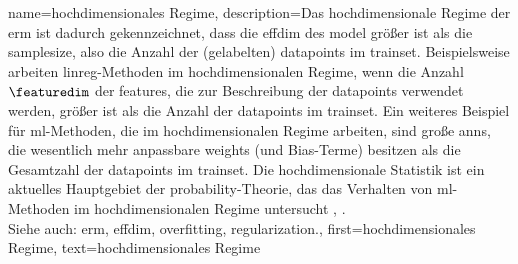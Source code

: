 {{{{
{
    name={hochdimensionales Regime}, 
    description={Das 
        hochdimensionale Regime der \gls{erm} ist dadurch gekennzeichnet, 
        dass die \gls{effdim} des \gls{model} größer ist als die \gls{samplesize}, 
        also die Anzahl der (gelabelten) \glspl{datapoint} im \gls{trainset}. 
        Beispielsweise arbeiten \gls{linreg}-Methoden im hochdimensionalen Regime, 
        wenn die Anzahl $\featuredim$ der \glspl{feature}, die zur Beschreibung der 
        \glspl{datapoint} verwendet werden, größer ist als die Anzahl der \glspl{datapoint} 
        im \gls{trainset}. 
        Ein weiteres Beispiel für \gls{ml}-Methoden, die im hochdimensionalen Regime arbeiten, 
        sind große \glspl{ann}, die wesentlich mehr anpassbare \gls{weights} (und Bias-Terme) 
        besitzen als die Gesamtzahl der \glspl{datapoint} im \gls{trainset}. 
        Die hochdimensionale Statistik ist ein aktuelles Hauptgebiet der 
        \gls{probability}-Theorie, das das Verhalten von \gls{ml}-Methoden 
        im hochdimensionalen Regime untersucht \cite{Wain2019}, \cite{BuhlGeerBook}.
        \\
        Siehe auch: \gls{erm}, \gls{effdim}, \gls{overfitting}, \gls{regularization}.},
    first={hochdimensionales Regime},
    text={hochdimensionales Regime} 
}

}}}}

